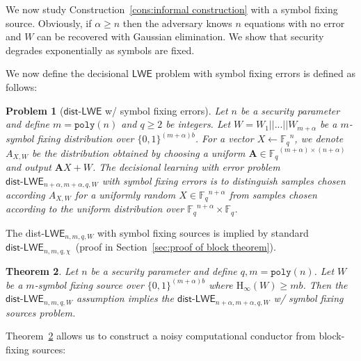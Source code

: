 \documentclass[11pt]{article}
\newcommand{\secref}[1]{\mbox{Section~\ref{#1}}}
\newcommand{\thref}[1]{\mbox{Theorem~\ref{#1}}}
\newcommand{\consref}[1]{\mbox{Construction~\ref{#1}}}
\newcommand{\class}[1]{{\ensuremath{\mathsf{#1}}}}
\newcommand{\zo}{\ensuremath{\{0, 1\}}}
\newcommand{\vect}[1]{\ensuremath{\textbf{#1}}}
\newcommand{\Fq}{\ensuremath{\mathbb{F}_q}}
\newcommand{\poly}{\ensuremath{\mathtt{poly}}\xspace}
\newcommand{\Hoo}{\mathrm{H}_\infty}
\newcommand{\LWE}{\class{LWE}}
\newcommand{\distLWE}{\ensuremath{\class{dist\mbox{-}LWE}}}
\newtheorem{theorem}{Theorem}[section]
\newtheorem{assumption}[theorem]{Assumption}
\newtheorem{problem}[theorem]{Problem}
\newcommand{\authnote}[2]{{\textcolor{red}{\textsf{#1 notes: }\textcolor{blue}{ #2}}\marginpar{\textcolor{red}{\textbf{!!!!!}}}}}
\newcommand{\authnote}[2]{}
\newcommand{\lnote}[1]{{\authnote{Leo}{#1}}}
\newcommand{\vA}{\vect{A}}
\newcommand{\ignore}[1]{}
\begin{document}
We now study \consref{cons:informal construction} with a symbol fixing source.  Obviously, if $\alpha \geq n$ then the adversary knows $n$ equations with no error and $W$ can be recovered with Gaussian elimination.  We show that security degrades exponentially as symbols are fixed.
\ignore{
\begin{assumption}[LWE w/ entropic errors]
Let $n$ be a security parameter and define $m = \poly(n)$ and $q\geq 2$ be integers.  Let $W = W_1||...||W_{m+\alpha}$ be a $m$-block fixing distribution over $\{0,1\}^{(m+\alpha)\ell}$. For a vector 
Let $A\in\Fq^{(m+\alpha)\times (n+\alpha)}$ and let $x\in\Fq^{n+\alpha}$.  No PPT algorithm given $Ax+W$ can recover $x$ with probability greater than nonnegligible.
\end{assumption}
}
We now define the decisional $\LWE$ problem with symbol fixing errors is defined as follows: 
\begin{problem}[$\distLWE$ w/ symbol fixing errors]
Let $n$ be a security parameter and define $m = \poly(n)$ and $q\geq 2$ be integers.  Let $W = W_1||...||W_{m+\alpha}$ be a $m$-symbol fixing distribution over $\{0,1\}^{(m+\alpha)b}$. For a vector $X \leftarrow \Fq^n$, we denote $A_{X, W}$ be the distribution obtained by choosing a uniform $\vA\in\Fq^{(m+\alpha)\times (n+\alpha)}$ and output $\vA X + W$. The decisional learning with error problem $\distLWE_{n+\alpha, m+\alpha, q, W}$ with symbol fixing errors is to distinguish samples chosen according $A_{X, W}$ for a uniformly random $X \in \Fq^{n+\alpha}$ from samples chosen according to the uniform distribution over $\Fq^{n+\alpha} \times \Fq$.
\end{problem}

The dist-$\LWE_{n, m, q, W}$ with symbol fixing sources is implied by standard $\distLWE_{n, m, q, \chi}$~(proof in \secref{sec:proof of block theorem}).
\begin{theorem}
\label{thm:blockLWE}
Let $n$ be a security parameter and define $q, m = \poly(n)$.  Let $W$ be a $m$-symbol fixing source over $\{0,1\}^{(m+\alpha)b}$ where $\Hoo(W) \geq mb$.  Then the $\distLWE_{n, m,q, W}$ assumption implies the $\distLWE_{n+\alpha, m+\alpha, q, W}$ w/ symbol fixing sources problem.
\end{theorem}

\thref{thm:blockLWE} allows us to construct a noisy computational conductor from block-fixing sources: 

\end{document}
